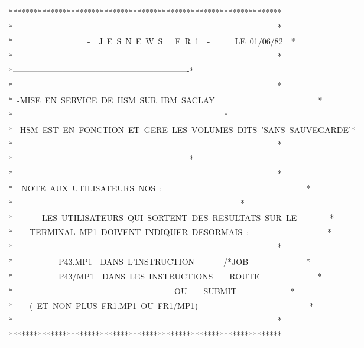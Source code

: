 {\scriptsize\ttfamily\begin{tabular}{@{}l@{}}
******************************************************************\\
*~~~~~~~~~~~~~~~~~~~~~~~~~~~~~~~~~~~~~~~~~~~~~~~~~~~~~~~~~~~~~~~~*\\
*~~~~~~~~~~~~~~~~~~-~~J~E~S~N~E~W~S~~~F~R~1~~-~~~~~~LE~01/06/82~~*\\
*~~~~~~~~~~~~~~~~~~~~~~~~~~~~~~~~~~~~~~~~~~~~~~~~~~~~~~~~~~~~~~~~*\\
*----------------------------------------------------------------*\\
*~~~~~~~~~~~~~~~~~~~~~~~~~~~~~~~~~~~~~~~~~~~~~~~~~~~~~~~~~~~~~~~~*\\
*~-MISE~EN~SERVICE~DE~HSM~SUR~IBM~SACLAY~~~~~~~~~~~~~~~~~~~~~~~~~*\\
*~--------------------------------------~~~~~~~~~~~~~~~~~~~~~~~~~*\\
*~-HSM~EST~EN~FONCTION~ET~GERE~LES~VOLUMES~DITS~'SANS~SAUVEGARDE'*\\
*~~~~~~~~~~~~~~~~~~~~~~~~~~~~~~~~~~~~~~~~~~~~~~~~~~~~~~~~~~~~~~~~*\\
*----------------------------------------------------------------*\\
*~~~~~~~~~~~~~~~~~~~~~~~~~~~~~~~~~~~~~~~~~~~~~~~~~~~~~~~~~~~~~~~~*\\
*~~NOTE~AUX~UTILISATEURS~NOS~:~~~~~~~~~~~~~~~~~~~~~~~~~~~~~~~~~~~*\\
*~~---------------------------~~~~~~~~~~~~~~~~~~~~~~~~~~~~~~~~~~~*\\
*~~~~~~~LES~UTILISATEURS~QUI~SORTENT~DES~RESULTATS~SUR~LE~~~~~~~~*\\
*~~~~TERMINAL~MP1~DOIVENT~INDIQUER~DESORMAIS~:~~~~~~~~~~~~~~~~~~~*\\
*~~~~~~~~~~~~~~~~~~~~~~~~~~~~~~~~~~~~~~~~~~~~~~~~~~~~~~~~~~~~~~~~*\\
*~~~~~~~~~~~P43.MP1~~DANS~L'INSTRUCTION~~~~~~~/*JOB~~~~~~~~~~~~~~*\\
*~~~~~~~~~~~P43/MP1~~DANS~LES~INSTRUCTIONS~~~~ROUTE~~~~~~~~~~~~~~*\\
*~~~~~~~~~~~~~~~~~~~~~~~~~~~~~~~~~~~~~~~OU~~~~SUBMIT~~~~~~~~~~~~~*\\
*~~~~(~ET~NON~PLUS~FR1.MP1~OU~FR1/MP1)~~~~~~~~~~~~~~~~~~~~~~~~~~~*\\
*~~~~~~~~~~~~~~~~~~~~~~~~~~~~~~~~~~~~~~~~~~~~~~~~~~~~~~~~~~~~~~~~*\\
******************************************************************
\end{tabular}}

